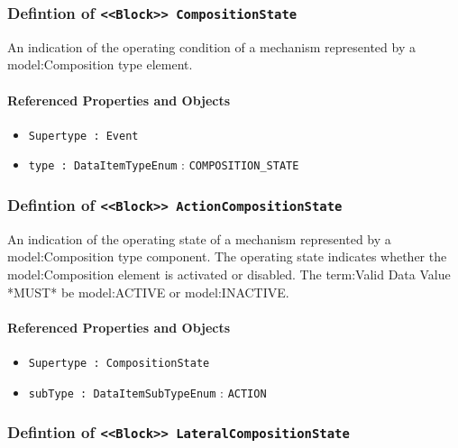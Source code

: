 \subsubsection{Defintion of \texttt{<<Block>> CompositionState}}
  \label{type:CompositionState}

\FloatBarrier

An indication of the operating condition of a mechanism represented by a {model:Composition} type element.

\FloatBarrier
\paragraph{Referenced Properties and Objects}

\begin{itemize}
\item \texttt{Supertype : Event}

\item \texttt{type : DataItemTypeEnum} : \texttt{COMPOSITION_STATE}

\end{itemize}
\FloatBarrier
\subsubsection{Defintion of \texttt{<<Block>> ActionCompositionState}}
  \label{type:ActionCompositionState}

\FloatBarrier

An indication of the operating state of a mechanism represented by a {model:Composition} type component.
 The operating state indicates whether the {model:Composition} element is activated or disabled. 
 The {term:Valid Data Value} *MUST* be {model:ACTIVE} or {model:INACTIVE}.

\FloatBarrier
\paragraph{Referenced Properties and Objects}

\begin{itemize}
\item \texttt{Supertype : CompositionState}

\item \texttt{subType : DataItemSubTypeEnum} : \texttt{ACTION}

\end{itemize}
\FloatBarrier
\subsubsection{Defintion of \texttt{<<Block>> LateralCompositionState}}
  \label{type:LateralCompositionState}

